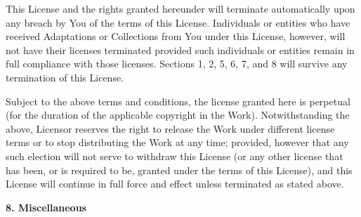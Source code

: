 \begin{doclicense@enumerate}
\item This License and the rights granted hereunder will
terminate automatically upon any breach by You of the
terms of this License. Individuals or entities who have
received Adaptations or Collections from You under this
License, however, will not have their licenses terminated
provided such individuals or entities remain in full
compliance with those licenses. Sections 1, 2, 5, 6, 7,
and 8 will survive any termination of this License.
\item Subject to the above terms and conditions, the
license granted here is perpetual (for the duration of
the applicable copyright in the Work). Notwithstanding
the above, Licensor reserves the right to release the
Work under different license terms or to stop
distributing the Work at any time; provided, however that
any such election will not serve to withdraw this License
(or any other license that has been, or is required to
be, granted under the terms of this License), and this
License will continue in full force and effect unless
terminated as stated above.
\end{doclicense@enumerate}
\par \textbf{8. Miscellaneous}
